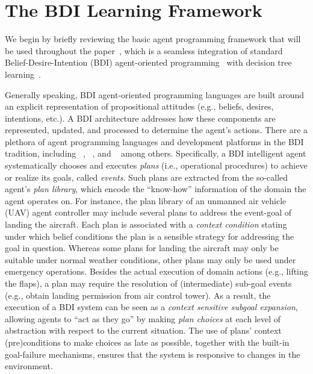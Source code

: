 \section{The BDI Learning Framework}\label{sec:framework}

We begin by briefly reviewing the basic agent programming framework that will be used throughout the paper~\cite{airiau09:enhancing,singh10:extending,singh10:learning}, which is a seamless integration of standard Belief-Desire-Intention (BDI) agent-oriented programming~\cite{Rao96:AgentSpeak,WooldridgeBook} with decision tree learning~\cite{Mitchell97:ML}. 

Generally speaking, BDI agent-oriented programming languages are built around an explicit representation of propositional attitudes (e.g., beliefs, desires, intentions, etc.). A BDI architecture addresses how these components are represented, updated, and processed to determine the agent's actions.
There are a plethora of agent programming languages and development platforms in the BDI tradition, including
\JACK~\cite{BusettaRHL:AL99-JACK}, 
\JADEX~\cite{Pokahr:EXP03-JADEX}, and
\JASON~\cite{jasonbook}
among others. 
Specifically, a BDI intelligent agent systematically chooses and executes \emph{plans} (i.e., operational procedures) to achieve or realize its goals, called \emph{events}.
Such plans are extracted from the so-called agent's \emph{plan library}, which encode the ``know-how'' information of the domain the agent operates on.
For instance, the plan library of an unmanned air vehicle (UAV) agent controller may include several plans to address the event-goal of landing the aircraft. Each plan is associated with a \emph{context condition} stating under which belief conditions the plan is a sensible strategy for addressing the goal in question. Whereas some plans for landing the aircraft may only be suitable under normal weather conditions, other plans may only be used under emergency operations.
Besides the actual execution of domain actions (e.g., lifting the flaps), a plan may require the resolution of (intermediate) sub-goal events (e.g., obtain landing permission from air control tower). As a result, the execution of a BDI system can be seen as a \textit{context sensitive subgoal expansion}, allowing agents to ``act as they go'' by making \emph{plan choices} at each level of abstraction with respect to the current situation. The use of plans' context (pre)conditions to make choices as late as possible, together with the built-in goal-failure mechanisms, ensures that the system is responsive to changes in the environment. 





